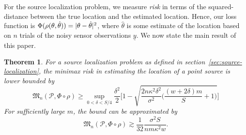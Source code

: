 \documentclass[conference]{IEEEtran}
\providecommand{\v}{}
\renewcommand{\v}[1]{\underline{#1}}
\DeclarePairedDelimiter\abs{\lvert}{\rvert}
\newcommand{\Phiorho}{\Phi\!\circ\!\rho}
\newtheorem{theorem}{Theorem}
\begin{document}
For the source localization problem, we measure \emph{risk} in terms of the
squared-distance between the true location and the estimated location. Hence,
our loss function is $\Phi(\rho(\theta, \hat\theta)) = \abs{\theta -
\hat\theta}^2$, where $\hat\theta$ is some estimate of the location based on
$n$ trials of the noisy sensor observations $\v y$. We now state the main
result of this paper.
\begin{theorem} \label{thm:main-lb}
	For a source localization problem as defined in
	section~\ref{sec:source-localization}, the minimax risk in estimating the
	location of a point source is lower bounded by
	\begin{equation*}
		\mathfrak{M}_n(\mathcal{P}, \Phi\circ\rho) \geq \sup_{0 < \delta < S/4} \frac{\delta^2}{2} \Bigg[1 - \sqrt{\frac{2n \kappa^2 \delta^2}{\sigma^2}\bigg(\!\frac{(w{+}2\delta) m}{S} + 1\!\bigg)} \Bigg]
	\end{equation*}
	For sufficiently large $m$, the bound can be approximated by
	\begin{equation} \label{eq:main-lower-bound}
		\mathfrak{M}_n(\mathcal{P}, \Phiorho) \gtrsim \frac{1}{32} \frac{\sigma^2 S}{nm\kappa^2w}.
	\end{equation}
\end{theorem}%
\end{document}
